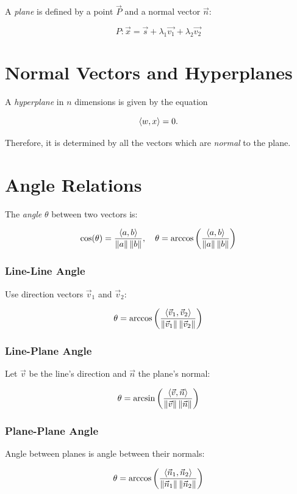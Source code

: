 A \emph{plane} is defined by a point \(\vec{P}\) and a normal vector \(\vec{n}\):

\[
	P: \vec{x} = \vec{s} + \lambda_1 \vec{v_1} + \lambda_2 \vec{v_2}
\]

\section{Normal Vectors and Hyperplanes}

A \emph{hyperplane} in \(n\) dimensions is given by the equation 

\[
	\left\langle w, x\right\rangle = 0.
\]

Therefore, it is determined by all the vectors which are \emph{normal} to the plane.

\section{Angle Relations}

The \emph{angle} \(\theta\) between two vectors is:

\[
	\cos(\theta) = \frac{\left\langle a, b\right\rangle}{\left\| a \right\|\left\| b \right\|}, \quad \theta = \arccos\left( \frac{\left\langle a, b\right\rangle}{\left\| a \right\|\left\| b \right\|} \right)
\]

\subsubsection{Line-Line Angle}

Use direction vectors \(\vec{v}_1\) and \(\vec{v}_2\):

\[
	\theta = \arccos\left( \frac{\left\langle\vec{v}_1, \vec{v}_2\right\rangle}{\left\| \vec{v}_1 \right\|\left\| \vec{v}_2 \right\|} \right)
\]

\subsubsection{Line-Plane Angle}

Let \(\vec{v}\) be the line's direction and \(\vec{n}\) the plane's normal:

\[
	\theta = \arcsin\left( \frac{\left\langle\vec{v}, \vec{n}\right\rangle}{\left\| \vec{v} \right\|\left\| \vec{n} \right\|} \right)
\]

\subsubsection{Plane-Plane Angle}

Angle between planes is angle between their normals:

\[
	\theta = \arccos\left( \frac{\left\langle\vec{n}_1, \vec{n}_2\right\rangle}{\left\| \vec{n}_1 \right\|\left\| \vec{n}_2 \right\|} \right)
\]

